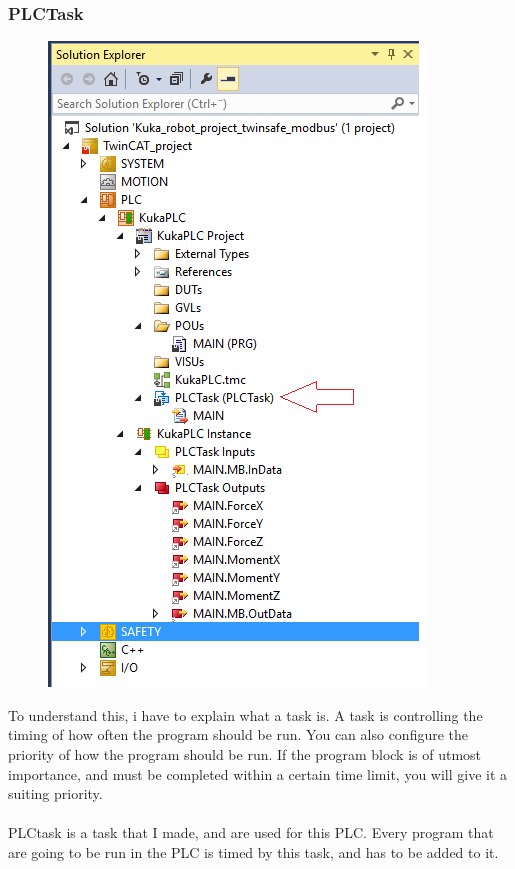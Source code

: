 \documentclass{article}
\begin{document}
\subsubsection{PLCTask}
\begin{figure}[!h]
    \centering
    \includegraphics[scale=0.7]{pictures/TC3_overview/TC3_PLCTask.png}
    \caption{}
    \label{fig:my_label}
\end{figure}

To understand this, i have to explain what a task is. A task is controlling the timing of how often the program should be run. You can also configure the priority of how the program should be run. If the program block is of utmost importance, and must be completed within a certain time limit, you will give it a suiting priority. 
\\
\\
PLCtask is a task that I made, and are used for this PLC. Every program that are going to be run in the PLC is timed by this task, and has to be added to it. 
\end{document}
